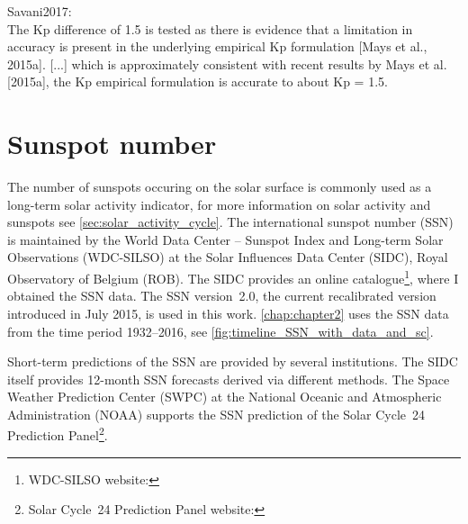 Savani2017:\\
The Kp difference of 1.5 is tested as there is evidence that a limitation in accuracy is present in the underlying empirical Kp formulation [Mays et al., 2015a]. [...] which is approximately consistent with recent results by Mays et al. [2015a], the Kp empirical formulation is accurate to about Kp = 1.5.\\




\section{Sunspot number}
\label{sec:sunspot_number}
The number of sunspots occuring on the solar surface is commonly used as a long-term solar activity indicator, for more information on solar activity and sunspots see \autoref{sec:solar_activity_cycle}. The international sunspot number (SSN) is maintained by the World Data Center -- Sunspot Index and Long-term Solar Observations (WDC-SILSO) at the Solar Influences Data Center (SIDC), Royal Observatory of Belgium (ROB). The SIDC provides an online catalogue\footnote{WDC-SILSO website: }, where I obtained the SSN data. The SSN version~2.0, the current recalibrated version introduced in July 2015, is used in this work. \autoref{chap:chapter2} uses the SSN data from the time period 1932--2016, see \autoref{fig:timeline_SSN_with_data_and_sc}.

Short-term predictions of the SSN are provided by several institutions. The SIDC itself provides 12-month SSN forecasts derived via different methods. The Space Weather Prediction Center (SWPC) at the National Oceanic and Atmospheric Administration (NOAA) supports the SSN prediction of the Solar Cycle~24 Prediction Panel\footnote{Solar Cycle~24 Prediction Panel website: }.


